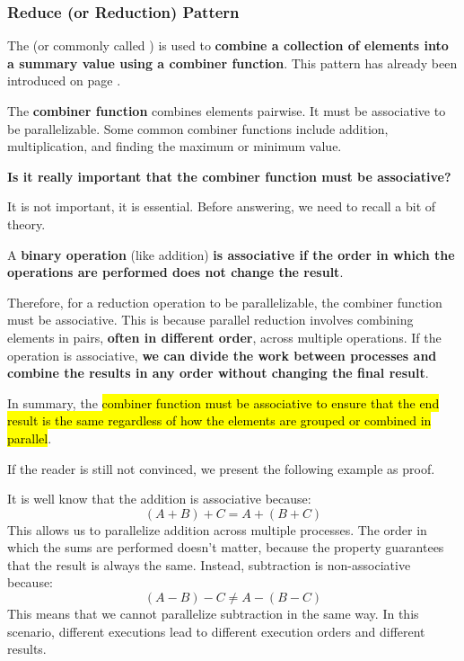 \subsubsection{Reduce (or Reduction) Pattern}

The  (or commonly called ) is used to \textbf{combine a collection of elements into a summary value using a combiner function}. This pattern has already been introduced on page .

\highspace
The \textbf{combiner function} combines elements pairwise. It must be associative to be parallelizable. Some common combiner functions include addition, multiplication, and finding the maximum or minimum value.

\highspace
\begin{flushleft}
    \textcolor{Green3}{ \textbf{Is it really important that the combiner function must be associative?}}
\end{flushleft}
It is not important, it is essential. Before answering, we need to recall a bit of theory.

\highspace
A \textbf{binary operation} (like addition) \textbf{is associative if the order in which the operations are performed does not change the result}.

\highspace
Therefore, for a reduction operation to be parallelizable, the combiner function must be associative. This is because parallel reduction involves combining elements in pairs, \textbf{often in different order}, across multiple operations. If the operation is associative, \textbf{we can divide the work between processes and combine the results in any order without changing the final result}.

\highspace
In summary, the \hl{combiner function must be associative to ensure that the end result is the same regardless of how the elements are grouped or combined in parallel}.

\highspace
If the reader is still not convinced, we present the following example as proof.

\highspace
\begin{examplebox}
    It is well know that the addition is associative because:
    \begin{equation*}
        \left(A + B\right) + C = A + \left(B + C\right)
    \end{equation*}
    This allows us to parallelize addition across multiple processes. The order in which the sums are performed doesn't matter, because the property guarantees that the result is always the same. Instead, subtraction is non-associative because:
    \begin{equation*}
        \left(A - B\right) - C \ne A - \left(B - C\right)
    \end{equation*}
    This means that we cannot parallelize subtraction in the same way. In this scenario, different executions lead to different execution orders and different results.
\end{examplebox}

